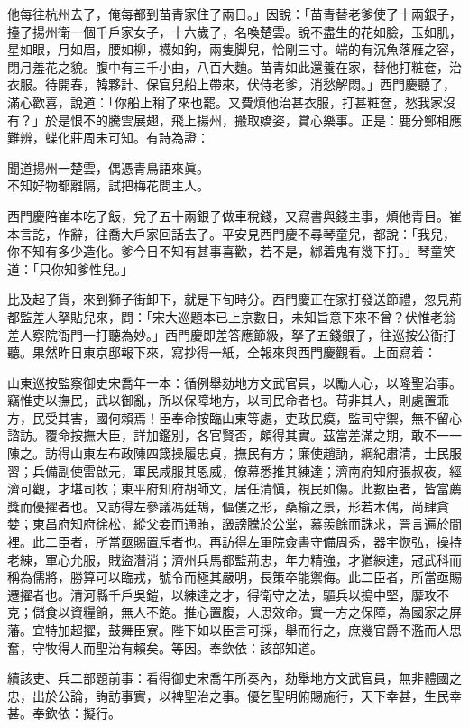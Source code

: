 他每往杭州去了，俺每都到苗青家住了兩日。」因說：「苗青替老爹使了十兩銀子，擡了揚州衛一個千戶家女子，十六歲了，名喚楚雲。說不盡生的花如臉，玉如肌，星如眼，月如眉，腰如柳，襪如鉤，兩隻脚兒，恰剛三寸。端的有沉魚落雁之容，閉月羞花之貌。腹中有三千小曲，八百大麯。苗青如此還養在家，替他打粧奩，治衣服。待開春，韓夥計、保官兒船上帶來，伏侍老爹，消愁解悶。」西門慶聽了，滿心歡喜，說道：「你船上稍了來也罷。又費煩他治甚衣服，打甚粧奩，愁我家沒有？」於是恨不的騰雲展翅，飛上揚州，搬取嬌姿，賞心樂事。正是：鹿分鄭相應難辨，蝶化莊周未可知。有詩為證：

\begin{myquote} 
聞道揚州一楚雲，偶憑青鳥語來眞。\\不知好物都離隔，試把梅花問主人。
\end{myquote} 

西門慶陪崔本吃了飯，兌了五十兩銀子做車稅錢，又寫書與錢主事，煩他青目。崔本言訖，作辭，往喬大戶家回話去了。平安見西門慶不尋琴童兒，都說：「我兒，你不知有多少造化。爹今日不知有甚事喜歡，若不是，綁着鬼有幾下打。」琴童笑道：「只你知爹性兒。」

比及起了貨，來到獅子街卸下，就是下旬時分。西門慶正在家打發送節禮，忽見荊都監差人拏貼兒來，問：「宋大巡題本已上京數日，{}未知旨意下來不曾？伏惟老翁差人察院衙門一打聽為妙。」西門慶即差答應節級，拏了五錢銀子，往巡按公衙打聽。果然昨日東京邸報下來，寫抄得一紙，全報來與西門慶觀看。上面寫着：

\begin{myquote}[\markfont]
山東巡按監察御史宋喬年一本：循例舉劾地方文武官員，以勵人心，以隆聖治事。竊惟吏以撫民，武以御亂，所以保障地方，以司民命者也。苟非其人，則處置乖方，民受其害，國何賴焉！臣奉命按臨山東等處，吏政民瘼，監司守禦，無不留心諮訪。覆命按撫大臣，詳加鑑別，各官賢否，頗得其實。茲當差滿之期，敢不一一陳之。訪得山東左布政陳四箴操履忠貞，撫民有方；廉使趙訥，綱紀肅清，士民服習；兵備副使雷啟元，軍民咸服其恩威，僚幕悉推其練達；濟南府知府張叔夜，經濟可觀，才堪司牧；東平府知府胡師文，居任清愼，視民如傷。此數臣者，皆當薦獎而優擢者也。又訪得左參議馮廷鵠，傴僂之形，桑榆之景，形若木偶，尚肆貪婪；東昌府知府徐松，縱父妾而通賄，譭謗騰於公堂，慕羨餘而誅求，詈言遍於間裡。此二臣者，所當亟賜置斥者也。再訪得左軍院僉書守備周秀，器宇恢弘，操持老練，軍心允服，賊盜潛消；濟州兵馬都監荊忠，年力精強，才猶練達，冠武科而稱為儒將，勝算可以臨戎，號令而極其嚴明，長策卒能禦侮。此二臣者，所當亟賜遷擢者也。清河縣千戶吳鎧，以練達之才，得衛守之法，驅兵以搗中堅，靡攻不克；儲食以資糧餉，無人不飽。推心置腹，人思效命。實一方之保障，為國家之屏藩。宜特加超擢，鼓舞臣寮。陛下如以臣言可採，舉而行之，庶幾官爵不濫而人思奮，守牧得人而聖治有賴矣。等因。奉欽依：該部知道。

續該吏、兵二部題前事：看得御史宋喬年所奏內，劾舉地方文武官員，無非體國之忠，出於公論，詢訪事實，以裨聖治之事。優乞聖明俯賜施行，天下幸甚，生民幸甚。奉欽依：擬行。
\end{myquote} 

